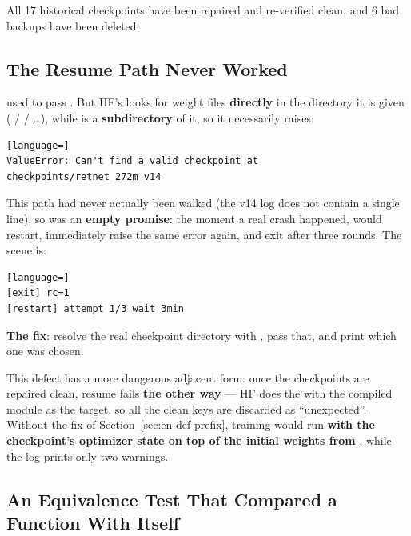 \documentclass[11pt,openany]{article}
\begin{document}
All 17 historical checkpoints have been repaired and re-verified clean, and 6 bad backups have
been deleted.

\subsection{The Resume Path Never Worked}
\label{sec:en-def-resume}

 used to pass . But HF's
 looks for weight files \textbf{directly} in the
directory it is given ( /  / \dots), while
 is a \textbf{subdirectory} of it, so it necessarily raises:

\begin{lstlisting}[language=]
ValueError: Can't find a valid checkpoint at checkpoints/retnet_272m_v14
\end{lstlisting}

This path had never actually been walked (the v14 log does not contain a single
\code{[restart]} line), so  was an \textbf{empty promise}: the
moment a real crash happened,  would restart, immediately raise the same
error again, and exit after three rounds. The scene is:

\begin{lstlisting}[language=]
[exit] rc=1
[restart] attempt 1/3 wait 3min
\end{lstlisting}

\textbf{The fix}: resolve the real checkpoint directory with
, pass that, and print
which one was chosen.

\begin{notebox}
This defect has a more dangerous adjacent form: once the checkpoints are repaired clean, resume
fails \textbf{the other way} --- HF does the  with the compiled module
as the target, so all the clean keys are discarded as ``unexpected''. Without the fix of
Section~\ref{sec:en-def-prefix}, training would run \textbf{with the checkpoint's optimizer
state on top of the initial weights from }, while the log prints only two
 warnings.
\end{notebox}

\subsection{An Equivalence Test That Compared a Function With Itself}
\label{sec:en-def-equiv}
\end{document}
